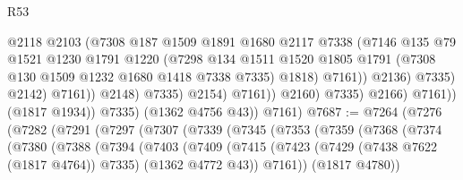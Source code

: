 \begin{lexlean}{R53}
\begin{coremodule}
                                          @2118
                                          @2103
                                          (@7308
                                            @187
                                            @1509
                                            @1891
                                            @1680
                                            @2117
                                            @7338
                                            (@7146
                                              @135
                                              @79
                                              @1521
                                              @1230
                                              @1791
                                              @1220
                                              (@7298
                                                @134
                                                @1511
                                                @1520
                                                @1805
                                                @1791
                                                (@7308 @130 @1509 @1232 @1680 @1418 @7338 @7335)
                                                @1818)
                                              @7161))
                                          @2136)
                                        @7335)
                                      @2142)
                                    @7161))
                                @2148)
                              @7335)
                            @2154)
                          @7161))
                      @2160)
                    @7335)
                  @2166)
                @7161))
            (@1817 @1934))
          @7335)
        (@1362 @4756 @43))
      @7161)
@7687 := @7264
    (@7276
      (@7282
        (@7291
          (@7297
            (@7307
              (@7339
                (@7345
                  (@7353
                    (@7359
                      (@7368
                        (@7374
                          (@7380
                            (@7388
                              (@7394
                                (@7403
                                  (@7409
                                    (@7415
                                      (@7423
                                        (@7429 (@7438 @7622 (@1817 @4764)) @7335)
                                        (@1362 @4772 @43))
                                      @7161))
                                  (@1817 @4780))

\end{coremodule}
\end{lexlean}
